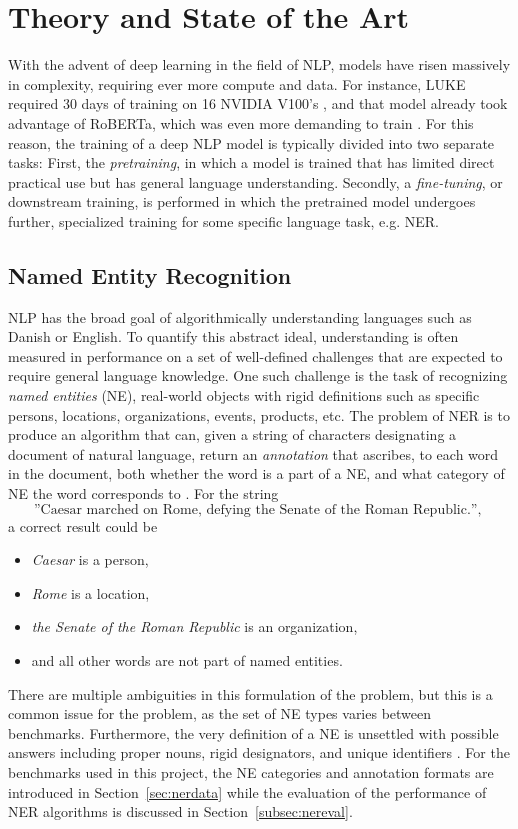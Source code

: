 \documentclass[main.tex]{subfiles}
\begin{document}
\chapter{Theory and State of the Art}
\label{chap:theory}
With the advent of deep learning in the field of NLP, models have risen massively in complexity, requiring ever more compute and data.
For instance, LUKE required 30 days of training on 16 NVIDIA V100's \cite{yamada2020luke}, and that model already took advantage of RoBERTa, which was even more demanding to train \cite{liu2019roberta}.
For this reason, the training of a deep NLP model is typically divided into two separate tasks:
First, the \emph{pretraining}, in which a model is trained that has limited direct practical use but has general language understanding.
Secondly, a \emph{fine-tuning}, or downstream training, is performed in which the pretrained model undergoes further, specialized training for some specific language task, e.g. NER.


\section{Named Entity Recognition}
NLP has the broad goal of algorithmically understanding languages such as Danish or English.
To quantify this abstract ideal, understanding is often measured in performance on a set of well-defined challenges that are expected to require general language knowledge.
One such challenge is the task of recognizing \emph{named entities} (NE), real-world objects with rigid definitions such as specific persons, locations, organizations, events, products, etc.
The problem of NER is to produce an algorithm that can, given a string of characters designating a document of natural language, return an \emph{annotation} that ascribes, to each word in the document, both whether the word is a part of a NE, and what category of NE the word corresponds to \cite{wiki2021ner}.
For the string
\[
    \text{
        ''Caesar marched on Rome, defying the Senate of the Roman Republic.'',
    }
\]
a correct result could be
\begin{itemize}
    \item \emph{Caesar} is a person,
    \item \emph{Rome} is a location,
    \item \emph{the Senate of the Roman Republic} is an organization,
    \item and all other words are not part of named entities.
\end{itemize}
There are multiple ambiguities in this formulation of the problem, but this is a common issue for the problem, as the set of NE types varies between benchmarks.
Furthermore, the very definition of a NE is unsettled with possible answers including proper nouns, rigid designators, and unique identifiers \cite[Sec. 4]{marrero2013ner}.
For the benchmarks used in this project, the NE categories and annotation formats are introduced in Section~\ref{sec:nerdata} while the evaluation of the performance of NER algorithms is discussed in Section~\ref{subsec:nereval}.
\end{document}
